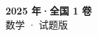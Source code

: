 \documentclass[zihao=-4, a4paper]{ctexart}
\begin{document}
\begin{center}
  {\Large\bfseries 2025 年·全国 1 卷}\\[4pt]
  {\large 数学 · 试题版}
\end{center}
\medskip
{}

\end{document}
